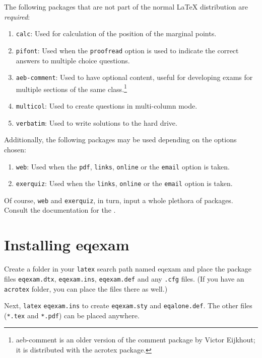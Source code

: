\documentclass{article}
\let\pkg\textsf
\begin{document}
The following packages that are not part of the normal {\LaTeX}
distribution are \emph{required}:
\begin{enumerate}
\item \texttt{calc}: Used for calculation of the position of the
    marginal points.

\item \texttt{pifont}: Used when the \texttt{proofread} option is
    used to indicate the correct answers to multiple choice questions.

\item \texttt{aeb-comment}: Used to have optional content, useful for
    developing exams for multiple sections of the same class.\footnote{\pkg{aeb-comment}
    is an older version of the \pkg{comment} package by Victor Eijkhout; it is distributed
    with the \pkg{acrotex} package.}

\item \texttt{multicol}: Used to create questions in multi-column mode.

\item \texttt{verbatim}: Used to write solutions to the hard drive.
\end{enumerate}

\noindent Additionally, the following packages may be used
depending on the options chosen:
\begin{enumerate}
\item \texttt{web}: Used when the \texttt{pdf}, \texttt{links},
    \texttt{online} or the \texttt{email} option is taken.

\item \texttt{exerquiz}: Used when the
    \texttt{links}, \texttt{online} or the \texttt{email} option is
    taken.
\end{enumerate}
Of course, \texttt{web} and \texttt{exerquiz}, in turn, input a
whole plethora of packages. Consult the documentation for the
\cAcroEB.

\section{Installing \textsf{eqexam}}

Create a folder in your \texttt{latex} search path named
\textsf{eqexam} and place the package files \texttt{eqexam.dtx},
\texttt{eqexam.ins}, \texttt{eqexam.def} and any \texttt{.cfg}
files. (If you have an \texttt{acrotex} folder, you can place the
files there as well.)

Next, \texttt{latex} \texttt{eqexam.ins} to create
\texttt{eqexam.sty} and \texttt{eqalone.def}. The other files
(\texttt{*.tex} and \texttt{*.pdf}) can be placed anywhere.
\end{document}
